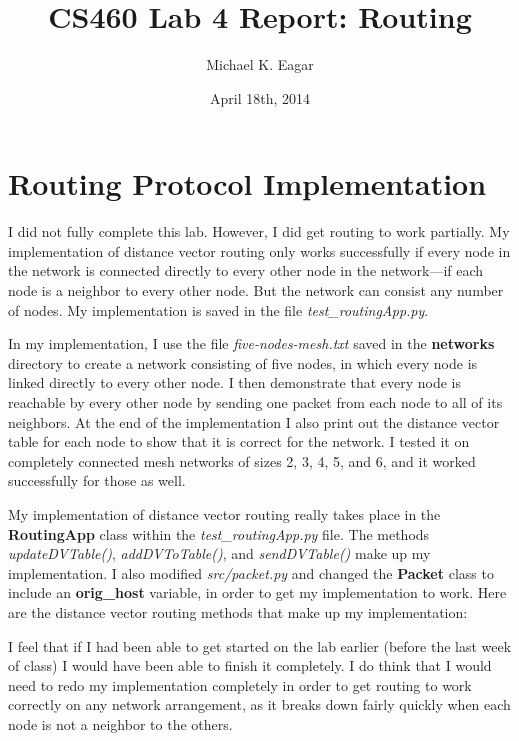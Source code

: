 \documentclass[11pt]{article}
\begin{document}

\title{CS460 Lab 4 Report: Routing}

\author{Michael K. Eagar}

\date{April 18th, 2014}

\maketitle

\section{Routing Protocol Implementation}

I did not fully complete this lab. However, I did get routing to work partially. My implementation of distance vector routing only works successfully if every node in the network is connected directly to every other node in the network---if each node is a neighbor to every other node. But the network can consist any number of nodes. My implementation is saved in the file \textit{test\_routingApp.py}.

In my implementation, I use the file \textit{five-nodes-mesh.txt} saved in the \textbf{networks} directory to create a network consisting of five nodes, in which every node is linked directly to every other node. I then demonstrate that every node is reachable by every other node by sending one packet from each node to all of its neighbors. At the end of the implementation I also print out the distance vector table for each node to show that it is correct for the network. I tested it on completely connected mesh networks of sizes 2, 3, 4, 5, and 6, and it worked successfully for those as well.

My implementation of distance vector routing really takes place in the \textbf{RoutingApp} class within the \textit{test\_routingApp.py} file.  The methods \textit{updateDVTable()}, \textit{addDVToTable()}, and \textit{sendDVTable()} make up my implementation. I also modified \textit{src/packet.py} and changed the \textbf{Packet} class to include an \textbf{orig\_host} variable, in order to get my implementation to work. Here are the distance vector routing methods that make up my implementation:

\vspace{0.25cm}

I feel that if I had been able to get started on the lab earlier (before the last week of class) I would have been able to finish it completely. I do think that I would need to redo my implementation completely in order to get routing to work correctly on any network arrangement, as it breaks down fairly quickly when each node is not a neighbor to the others.
\end{document}

